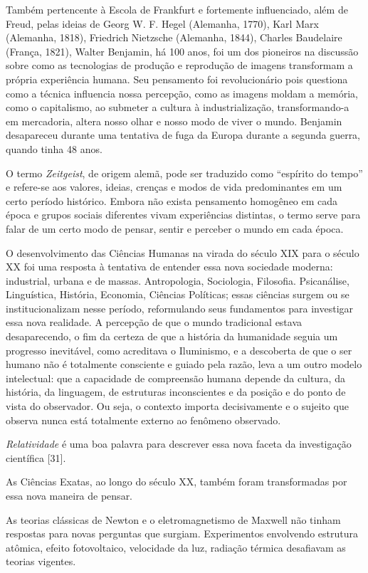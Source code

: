 \documentclass{hipatia}
\begin{document}
Também pertencente à Escola de Frankfurt e fortemente influenciado, além de Freud, pelas ideias de Georg W. F. Hegel (Alemanha, 1770), Karl Marx (Alemanha, 1818), Friedrich Nietzsche (Alemanha, 1844), Charles Baudelaire (França, 1821), Walter Benjamin, há 100 anos, foi um dos pioneiros na discussão sobre como as tecnologias de produção e reprodução de imagens transformam a própria experiência humana. Seu pensamento foi revolucionário pois questiona como a técnica influencia nossa percepção, como as imagens moldam a memória, como o capitalismo, ao submeter a cultura à industrialização, transformando-a em mercadoria, altera nosso olhar e nosso modo de viver o mundo. Benjamin desapareceu durante uma tentativa de fuga da Europa durante a segunda guerra, quando tinha 48 anos.

O termo \textit{Zeitgeist}, de origem alemã, pode ser traduzido como ``espírito do tempo'' e refere-se aos valores, ideias, crenças e modos de vida predominantes em um certo período histórico. Embora não exista pensamento homogêneo em cada época e grupos sociais diferentes vivam experiências distintas, o termo serve para falar de um certo modo de pensar, sentir e perceber o mundo em cada época. 

O desenvolvimento das Ciências Humanas na virada do século XIX para o século XX foi uma resposta à tentativa de entender essa nova sociedade moderna: industrial, urbana e de massas. Antropologia, Sociologia, Filosofia. Psicanálise, Linguística, História, Economia, Ciências Políticas; essas ciências surgem ou se institucionalizam nesse período, reformulando seus fundamentos para investigar essa nova realidade. A percepção de que o mundo tradicional estava desaparecendo, o fim da certeza de que a história da humanidade seguia um progresso inevitável, como acreditava o Iluminismo, e a descoberta de que o ser humano não é totalmente consciente e guiado pela razão, leva a um outro modelo intelectual: que a capacidade de compreensão humana depende da cultura, da história, da linguagem, de estruturas inconscientes e da posição e do ponto de vista do observador. Ou seja, o contexto importa decisivamente e o sujeito que observa nunca está totalmente externo ao fenômeno observado.

\textit{Relatividade} é uma boa palavra para descrever essa nova faceta da investigação científica [31].

As Ciências Exatas, ao longo do século XX, também foram transformadas por essa nova maneira de pensar.

As teorias clássicas de Newton e o eletromagnetismo de Maxwell não tinham respostas para novas perguntas que surgiam. Experimentos envolvendo estrutura atômica, efeito fotovoltaico, velocidade da luz, radiação térmica desafiavam as teorias vigentes. 
\end{document}
